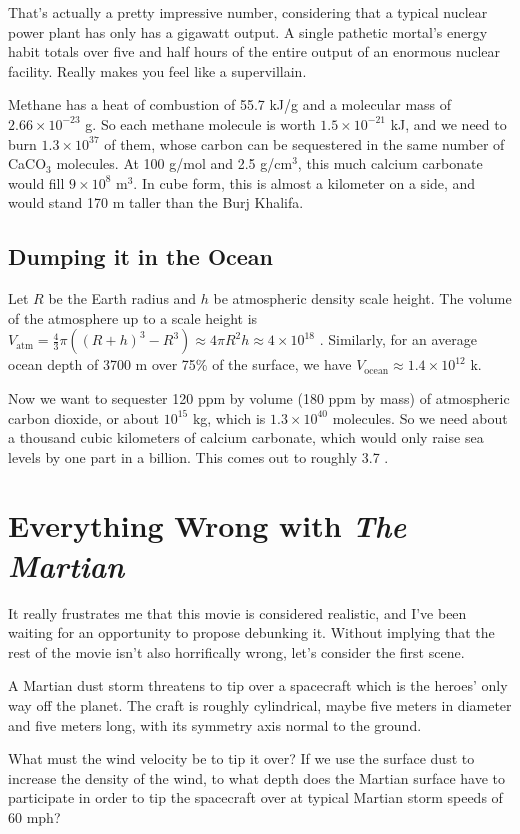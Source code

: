 \documentclass[12pt]{article}
\begin{document}
That's actually a pretty impressive number, considering that a typical nuclear power plant has only has a gigawatt output. A single pathetic mortal's energy habit totals over five and half hours of the entire output of an enormous nuclear facility. Really makes you feel like a supervillain.

Methane has a heat of combustion of 55.7 kJ/g and a molecular mass of \(2.66 \times 10^{-23}\) g. So each methane molecule is worth \(1.5 \times 10^{-21}\) kJ, and we need to burn \(1.3 \times 10^{37}\) of them, whose carbon can be sequestered in the same number of CaCO\(_3\) molecules. At 100 g/mol and 2.5 g/cm\(^3\), this much calcium carbonate would fill \(9\times 10^8\) m\(^3\). In cube form, this is almost a kilometer on a side, and would stand 170 m taller than the Burj Khalifa.

\subsection{Dumping it in the Ocean}

Let \(R\) be the Earth radius and \(h\) be atmospheric density scale height. The volume of the atmosphere up to a scale height is \(V_{\mathrm{atm}} = \frac{4}{3}\pi( (R+h)^3 - R^3 ) \approx 4\pi R^2h \approx 4 \times 10^{18}\) \mcb. Similarly, for an average ocean depth of 3700 m over 75\% of the surface, we have \(V_{\mathrm{ocean}} \approx 1.4 \times 10^{12}\) k\mcb.

Now we want to sequester 120 ppm by volume (180 ppm by mass) of atmospheric carbon dioxide, or about \(10^{15}\) kg, which is \(1.3 \times 10^{40}\) molecules. So we need about a thousand cubic kilometers of calcium carbonate, which would only raise sea levels by one part in a billion. This comes out to roughly 3.7 \micron.



\section{Everything Wrong with \textit{The Martian}}

It really frustrates me that this movie is considered realistic, and I've been waiting for an opportunity to propose debunking it. Without implying that the rest of the movie isn't also horrifically wrong, let's consider the first scene.

A Martian dust storm threatens to tip over a spacecraft which is the heroes' only way off the planet. The craft is roughly cylindrical, maybe five meters in diameter and five meters long, with its symmetry axis normal to the ground.

What must the wind velocity be to tip it over? If we use the surface dust to increase the density of the wind, to what depth does the Martian surface have to participate in order to tip the spacecraft over at typical Martian storm speeds of 60 mph?
\end{document}
